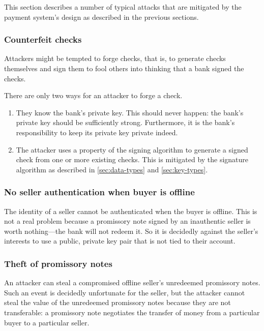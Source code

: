 \documentclass[12pt,a4paper]{article}
\begin{document}
\begin{multicols}{2}
	This section describes a number of typical attacks that are mitigated by the payment system's design as described in the previous sections.

	\subsubsection{Counterfeit checks}

	Attackers might be tempted to forge checks, that is, to generate checks themselves and sign them to fool others into thinking that a bank signed the checks.
	
	There are only two ways for an attacker to forge a check.
	
	\begin{enumerate}
		\item They know the bank's private key. This should never happen: the bank's private key should be sufficiently strong. Furthermore, it is the bank's responsibility to keep its private key private indeed.
		
		\item The attacker uses a property of the signing algorithm to generate a signed check from one or more existing checks. This is mitigated by the signature algorithm as described in \autoref{sec:data-types} and \autoref{sec:key-types}.
	\end{enumerate}

	\subsubsection{No seller authentication when buyer is offline} \label{sec:lack-of-seller-authentication}

	The identity of a seller cannot be authenticated when the buyer is offline. This is not a real problem because a promissory note signed by an inauthentic seller is worth nothing---the bank will not redeem it. So it is decidedly against the seller's interests to use a public, private key pair that is not tied to their account.
	
	\subsubsection{Theft of promissory notes}

	An attacker can steal a compromised offline seller's unredeemed promissory notes. Such an event is decidedly unfortunate for the seller, but the attacker cannot steal the value of the unredeemed promissory notes because they are not transferable: a promissory note negotiates the transfer of money from a particular buyer to a particular seller. 


\end{multicols}
\end{document}
